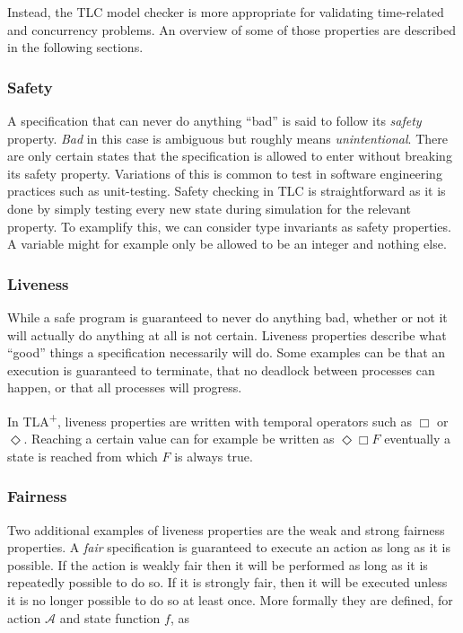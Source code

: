 \documentclass[english, biblatex, digitaloutput]{kththesis}
\begin{document}
Instead, the TLC model checker is more appropriate for validating time-related and concurrency problems. An overview of some of those properties are described in the following sections.

\subsubsection*{Safety}
\label{sec:safetyProperty}

A specification that can never do anything ``bad'' is said to follow its \textit{safety} property. \textit{Bad} in this case is ambiguous but roughly means \textit{unintentional}. There are only certain states that the specification is allowed to enter without breaking its safety property. Variations of this is common to test in software engineering practices such as unit-testing. Safety checking in TLC is straightforward as it is done by simply testing every new state during simulation for the relevant property. To examplify this, we can consider type invariants as safety properties. A variable might for example only be allowed to be an integer and nothing else.

\subsubsection*{Liveness}
\label{sec:livenessProperty}

While a safe program is guaranteed to never do anything bad, whether or not it will actually do anything at all is not certain. Liveness properties describe what ``good'' things a specification necessarily will do. Some examples can be that an execution is guaranteed to terminate, that no deadlock between processes can happen, or that all processes will progress.

In TLA\textsuperscript+, liveness properties are written with temporal operators such as $\Box$ or $\Diamond$. Reaching a certain value can for example be written as $\Diamond \Box F$ \ie eventually a state is reached from which $F$ is always true.

\subsubsection*{Fairness}

Two additional examples of liveness properties are the weak and strong fairness properties. A \textit{fair} specification is guaranteed to execute an action as long as it is possible. If the action is weakly fair then it will be performed as long as it is repeatedly possible to do so. If it is strongly fair, then it will be executed unless it is no longer possible to do so at least once. More formally they are defined, for action $\mathcal{A}$ and state function $f$, as
\end{document}
